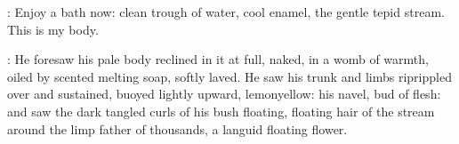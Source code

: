 \BloomInt:
Enjoy a bath now:
clean trough of water,
cool enamel,
the gentle tepid stream.
This is my body.

:
He foresaw his pale body reclined in it at full,
naked,
in a womb of warmth,
oiled by scented melting soap,
softly laved.
He saw his trunk and limbs riprippled over
and sustained,
buoyed lightly upward,
lemonyellow:
his navel, bud of flesh:
and saw the dark tangled curls of his bush
floating,
floating hair of the stream
around the limp father of thousands,
a languid floating flower.
